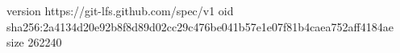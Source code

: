 version https://git-lfs.github.com/spec/v1
oid sha256:2a4134d20e92b8f8d89d02cc29c476be041b57e1e07f81b4caea752aff4184ae
size 262240
